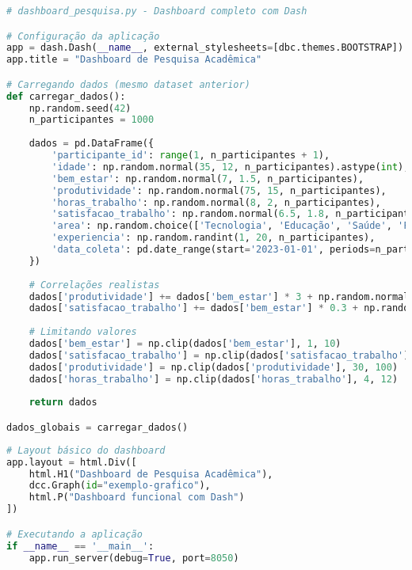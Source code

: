 \begin{pythonbox}
\begin{lstlisting}[language=Python]
# dashboard_pesquisa.py - Dashboard completo com Dash

# Configuração da aplicação
app = dash.Dash(__name__, external_stylesheets=[dbc.themes.BOOTSTRAP])
app.title = "Dashboard de Pesquisa Acadêmica"

# Carregando dados (mesmo dataset anterior)
def carregar_dados():
    np.random.seed(42)
    n_participantes = 1000
    
    dados = pd.DataFrame({
        'participante_id': range(1, n_participantes + 1),
        'idade': np.random.normal(35, 12, n_participantes).astype(int),
        'bem_estar': np.random.normal(7, 1.5, n_participantes),
        'produtividade': np.random.normal(75, 15, n_participantes),
        'horas_trabalho': np.random.normal(8, 2, n_participantes),
        'satisfacao_trabalho': np.random.normal(6.5, 1.8, n_participantes),
        'area': np.random.choice(['Tecnologia', 'Educação', 'Saúde', 'Finanças'], n_participantes),
        'experiencia': np.random.randint(1, 20, n_participantes),
        'data_coleta': pd.date_range(start='2023-01-01', periods=n_participantes, freq='H')
    })
    
    # Correlações realistas
    dados['produtividade'] += dados['bem_estar'] * 3 + np.random.normal(0, 5, n_participantes)
    dados['satisfacao_trabalho'] += dados['bem_estar'] * 0.3 + np.random.normal(0, 0.5, n_participantes)
    
    # Limitando valores
    dados['bem_estar'] = np.clip(dados['bem_estar'], 1, 10)
    dados['satisfacao_trabalho'] = np.clip(dados['satisfacao_trabalho'], 1, 10)
    dados['produtividade'] = np.clip(dados['produtividade'], 30, 100)
    dados['horas_trabalho'] = np.clip(dados['horas_trabalho'], 4, 12)
    
    return dados

dados_globais = carregar_dados()
\end{lstlisting}
\end{pythonbox}

\begin{pythonbox}
\begin{lstlisting}[language=Python]
# Layout básico do dashboard
app.layout = html.Div([
    html.H1("Dashboard de Pesquisa Acadêmica"),
    dcc.Graph(id="exemplo-grafico"),
    html.P("Dashboard funcional com Dash")
])

# Executando a aplicação
if __name__ == '__main__':
    app.run_server(debug=True, port=8050)
\end{lstlisting}
\end{pythonbox}

